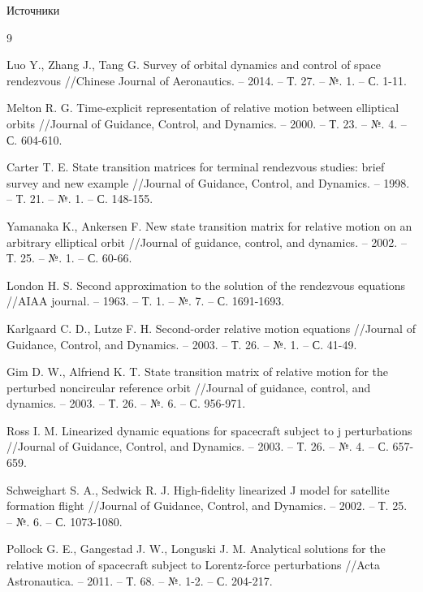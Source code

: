 \documentclass[8pt]{beamer}
\begin{document}
\begin{frame}[allowframebreaks]{Источники}
  \begin{thebibliography}{9}

    Luo Y., Zhang J., Tang G. Survey of orbital dynamics and control of space rendezvous //Chinese Journal of Aeronautics. – 2014. – Т. 27. – №. 1. – С. 1-11.

    Melton R. G. Time-explicit representation of relative motion between elliptical orbits //Journal of Guidance, Control, and Dynamics. – 2000. – Т. 23. – №. 4. – С. 604-610.

    Carter T. E. State transition matrices for terminal rendezvous studies: brief survey and new example //Journal of Guidance, Control, and Dynamics. – 1998. – Т. 21. – №. 1. – С. 148-155.

    Yamanaka K., Ankersen F. New state transition matrix for relative motion on an arbitrary elliptical orbit //Journal of guidance, control, and dynamics. – 2002. – Т. 25. – №. 1. – С. 60-66.

    London H. S. Second approximation to the solution of the rendezvous equations //AIAA journal. – 1963. – Т. 1. – №. 7. – С. 1691-1693.

    Karlgaard C. D., Lutze F. H. Second-order relative motion equations //Journal of Guidance, Control, and Dynamics. – 2003. – Т. 26. – №. 1. – С. 41-49.

    Gim D. W., Alfriend K. T. State transition matrix of relative motion for the perturbed noncircular reference orbit //Journal of guidance, control, and dynamics. – 2003. – Т. 26. – №. 6. – С. 956-971.

    Ross I. M. Linearized dynamic equations for spacecraft subject to j perturbations //Journal of Guidance, Control, and Dynamics. – 2003. – Т. 26. – №. 4. – С. 657-659.

    Schweighart S. A., Sedwick R. J. High-fidelity linearized J model for satellite formation flight //Journal of Guidance, Control, and Dynamics. – 2002. – Т. 25. – №. 6. – С. 1073-1080.

    Pollock G. E., Gangestad J. W., Longuski J. M. Analytical solutions for the relative motion of spacecraft subject to Lorentz-force perturbations //Acta Astronautica. – 2011. – Т. 68. – №. 1-2. – С. 204-217.


\end{thebibliography}
\end{frame}
\end{document}
